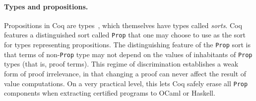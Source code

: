\documentclass[a4paper,10pt,runningheads]{llncs}
\begin{document}
\paragraph{Types and propositions.}

Propositions in Coq are types~\cite{ITT,CMCP}, which themselves have types called \emph{sorts}. Coq features a distinguished sort called \lstinline|Prop| that one may choose to use as the sort for types representing propositions. The distinguishing feature of the \lstinline|Prop| sort is that terms of non-\lstinline|Prop| type may not depend on the values of inhabitants of \lstinline|Prop| types (that is, proof terms).
This regime of discrimination establishes a weak form of proof irrelevance, in that changing a proof can never affect the result of value computations. On a very practical level, this lets Coq safely erase all \lstinline|Prop| components when extracting certified programs to OCaml or Haskell.


\end{document}
